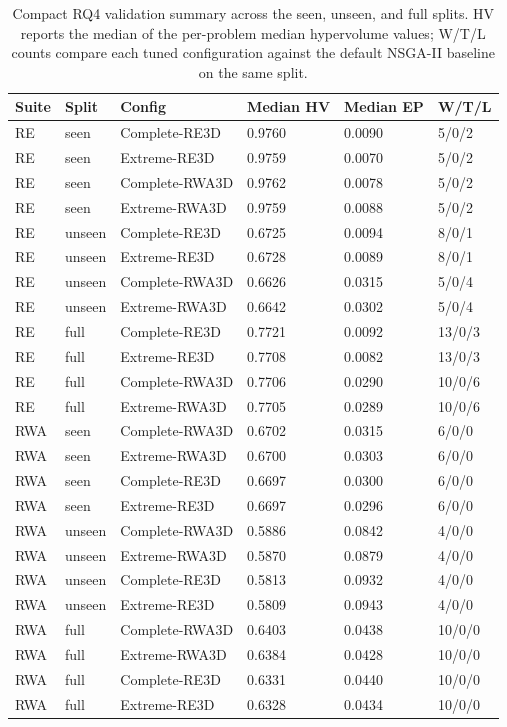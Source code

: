\begin{table}[htbp]
\centering
\caption{Compact RQ4 validation summary across the seen, unseen, and full splits. HV reports the median of the per-problem median hypervolume values; W/T/L counts compare each tuned configuration against the default NSGA-II baseline on the same split.}
\small
\begin{tabular}{llllll}
\toprule
Suite & Split & Config & Median HV & Median EP & W/T/L \\
\midrule
RE & seen & Complete-RE3D & 0.9760 & 0.0090 & 5/0/2 \\
RE & seen & Extreme-RE3D & 0.9759 & 0.0070 & 5/0/2 \\
RE & seen & Complete-RWA3D & 0.9762 & 0.0078 & 5/0/2 \\
RE & seen & Extreme-RWA3D & 0.9759 & 0.0088 & 5/0/2 \\
RE & unseen & Complete-RE3D & 0.6725 & 0.0094 & 8/0/1 \\
RE & unseen & Extreme-RE3D & 0.6728 & 0.0089 & 8/0/1 \\
RE & unseen & Complete-RWA3D & 0.6626 & 0.0315 & 5/0/4 \\
RE & unseen & Extreme-RWA3D & 0.6642 & 0.0302 & 5/0/4 \\
RE & full & Complete-RE3D & 0.7721 & 0.0092 & 13/0/3 \\
RE & full & Extreme-RE3D & 0.7708 & 0.0082 & 13/0/3 \\
RE & full & Complete-RWA3D & 0.7706 & 0.0290 & 10/0/6 \\
RE & full & Extreme-RWA3D & 0.7705 & 0.0289 & 10/0/6 \\
RWA & seen & Complete-RWA3D & 0.6702 & 0.0315 & 6/0/0 \\
RWA & seen & Extreme-RWA3D & 0.6700 & 0.0303 & 6/0/0 \\
RWA & seen & Complete-RE3D & 0.6697 & 0.0300 & 6/0/0 \\
RWA & seen & Extreme-RE3D & 0.6697 & 0.0296 & 6/0/0 \\
RWA & unseen & Complete-RWA3D & 0.5886 & 0.0842 & 4/0/0 \\
RWA & unseen & Extreme-RWA3D & 0.5870 & 0.0879 & 4/0/0 \\
RWA & unseen & Complete-RE3D & 0.5813 & 0.0932 & 4/0/0 \\
RWA & unseen & Extreme-RE3D & 0.5809 & 0.0943 & 4/0/0 \\
RWA & full & Complete-RWA3D & 0.6403 & 0.0438 & 10/0/0 \\
RWA & full & Extreme-RWA3D & 0.6384 & 0.0428 & 10/0/0 \\
RWA & full & Complete-RE3D & 0.6331 & 0.0440 & 10/0/0 \\
RWA & full & Extreme-RE3D & 0.6328 & 0.0434 & 10/0/0 \\
\bottomrule
\end{tabular}
\end{table}
